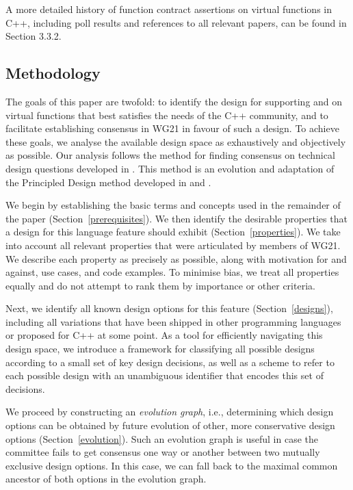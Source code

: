 A more detailed history of function contract assertions on virtual functions in C++, including poll results and references to all relevant papers, can be found in \cite{P2899R1} Section 3.3.2.

\subsection{Methodology}

The goals of this paper are twofold: to identify the design for supporting  and  on virtual functions that best satisfies the needs of the C++ community, and to facilitate establishing consensus in WG21 in favour of such a design. To achieve these goals, we analyse the available design space as exhaustively and objectively as possible. Our analysis follows the method for finding consensus on technical design questions developed in \cite{P3850R0}. This method is an evolution and adaptation of the Principled Design method developed in \cite{P3004R0} and \cite{P3005R0}.

We begin by establishing the basic terms and concepts used in the remainder of the paper (Section~\ref{prerequisites}). We then identify the desirable properties that a design for this language feature should exhibit (Section~\ref{properties}). We take into account all relevant properties that were articulated by members of WG21. We describe each property as precisely as possible, along with motivation for and against, use cases, and code examples. To minimise bias, we treat all properties equally and do not attempt to rank them by importance or other criteria.

Next, we identify all known design options for this feature (Section~\ref{designs}), including all variations that have been shipped in other programming languages or proposed for C++ at some point. As a tool for efficiently navigating this design space, we introduce a framework for classifying all possible designs according to a small set of key design decisions, as well as a scheme to refer to each possible design with an unambiguous identifier that encodes this set of decisions.

We proceed by constructing an \emph{evolution graph}, i.e., determining which design options can be obtained by future evolution of other, more conservative design options (Section~\ref{evolution}). Such an evolution graph is useful in case the committee fails to get consensus one way or another between two mutually exclusive design options. In this case, we can fall back to the maximal common ancestor of both options in the evolution graph.

